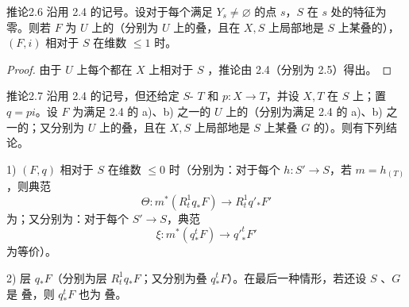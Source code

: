 \begin{SGAresult}{推论}{2.6}
沿用 2.4 的记号。设对于每个满足 $Y_s\ne\varnothing$ 的点 $s$，$S$ 在 $s$ 处的特征为零。则若 $F$ 为 $U$ 上的（分别为 $U$ 上的叠，且在 $X,S$ 上局部地是 $S$ 上某叠的），$(F,i)$ 相对于 $S$ 在维数 $\leqslant1$ 时。
\end{SGAresult}
\begin{proof}
由于 $U$ 上每个都在 $X$ 上相对于 $S$ ，推论由 2.4（分别为 2.5）得出。
\end{proof}

\begin{SGAresult}{推论}{2.7}
沿用 2.4 的记号，但还给定 $S$- $T$ 和 $p:X\to T$，并设 $X,T$ 在 $S$ 上；置 $q=pi$。设 $F$ 为满足 2.4 的 a)、b) 之一的 $U$ 上的（分别为满足 2.4 的 a)、b) 之一的；又分别为 $U$ 上的叠，且在 $X,S$ 上局部地是 $S$ 上某叠 $G$ 的）。则有下列结论。

1) $(F,q)$ 相对于 $S$ 在维数 $\leqslant0$ 时（分别为：对于每个 $h:S'\to S$，若 $m=h_{(T)}$，则典范
\[\Theta:m^*(R^1_tq_*F)\longrightarrow R^1_tq'_*F'\]
为；又分别为：对于每个 $S'\to S$，典范
\[\xi:m^*(q_*^tF)\longrightarrow {q'}_*^tF'\]
为等价）。

2) 层 $q_*F$（分别为层 $R^1_tq_*F$；又分别为叠 $q_*^tF$）。在最后一种情形，若还设 $S$ 、$G$ 是 叠，则 $q_*^tF$ 也为 叠。
\end{SGAresult}
